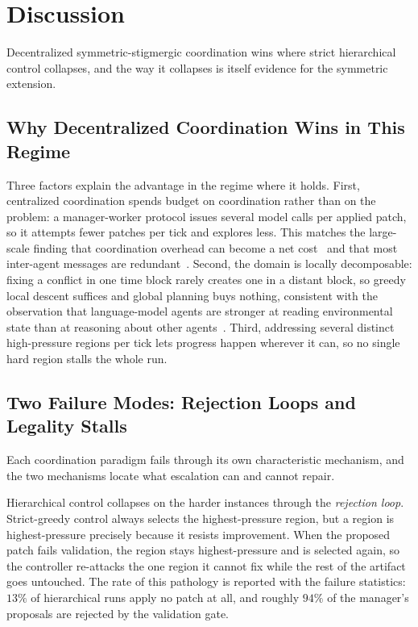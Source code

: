 
\section{Discussion}
\label{sec:discussion}

Decentralized symmetric-stigmergic coordination wins where strict hierarchical control collapses, and the way it collapses is itself evidence for the symmetric extension.

\subsection{Why Decentralized Coordination Wins in This Regime}

Three factors explain the advantage in the regime where it holds. First, centralized coordination spends budget on coordination rather than on the problem: a manager-worker protocol issues several model calls per applied patch, so it attempts fewer patches per tick and explores less. This matches the large-scale finding that coordination overhead can become a net cost~\cite{kim2025scaling} and that most inter-agent messages are redundant~\cite{zhang2025agentprune}. Second, the domain is locally decomposable: fixing a conflict in one time block rarely creates one in a distant block, so greedy local descent suffices and global planning buys nothing, consistent with the observation that language-model agents are stronger at reading environmental state than at reasoning about other agents~\cite{agashe2025coordination}. Third, addressing several distinct high-pressure regions per tick lets progress happen wherever it can, so no single hard region stalls the whole run.

\subsection{Two Failure Modes: Rejection Loops and Legality Stalls}
\label{sec:failure-analysis}

Each coordination paradigm fails through its own characteristic mechanism, and the two mechanisms locate what escalation can and cannot repair.

Hierarchical control collapses on the harder instances through the \emph{rejection loop}. Strict-greedy control always selects the highest-pressure region, but a region is highest-pressure precisely because it resists improvement. When the proposed patch fails validation, the region stays highest-pressure and is selected again, so the controller re-attacks the one region it cannot fix while the rest of the artifact goes untouched. The rate of this pathology is reported with the failure statistics: $13\%$ of hierarchical runs apply no patch at all, and roughly $94\%$ of the manager's proposals are rejected by the validation gate.

